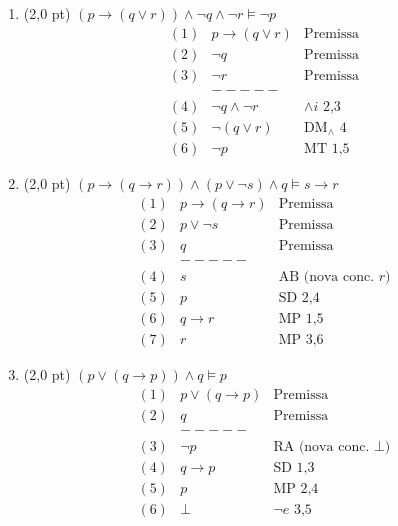 \documentclass[11pt,a4paper,oneside]{article}
\begin{document}
\begin{enumerate}
		\begin{enumerate}
			\item (2,0 pt) $(p \rightarrow (q \vee r)) \wedge \neg q \wedge \neg r \models \neg p$ \\
			{\color{verde}	
				\begin{eqnarray*}
					(1) & p \rightarrow (q \vee r) & \mbox{Premissa} \\
					(2) & \neg q  & \mbox{Premissa}\\
					(3) & \neg r & \mbox{Premissa}\\
					& ----- & \\
					(4) & \neg q \wedge \neg r & \wedge i \mbox{ 2,3}\\
					(5) & \neg (q \vee r) & \mbox{DM}_{\wedge} \mbox{ 4}\\
					(6) & \neg p & \mbox{MT 1,5}
				\end{eqnarray*}	
			}
			\item (2,0 pt) $(p \rightarrow (q \rightarrow r)) \wedge (p \vee \neg s) \wedge q \models s \rightarrow r$\\
			{\color{verde}	
				\begin{eqnarray*}
					(1) & p \rightarrow (q \rightarrow r) & \mbox{Premissa} \\
					(2) & p \vee \neg s  & \mbox{Premissa}\\
					(3) & q & \mbox{Premissa}\\
					& ----- & \\
					(4) & s & \mbox{AB (nova conc. } r \mbox{)}\\
					(5) & p & \mbox{SD 2,4}\\
					(6) & q \rightarrow r & \mbox{MP 1,5}\\
					(7) & r & \mbox{MP 3,6}
				\end{eqnarray*}	
			}			
			\item (2,0 pt) $(p \vee (q \rightarrow p)) \wedge q \models p$\\
			{\color{verde}	
				\begin{eqnarray*}
					(1) & p \vee (q \rightarrow p) & \mbox{Premissa} \\
					(2) & q  & \mbox{Premissa}\\
					& ----- & \\
					(3) & \neg p & \mbox{RA (nova conc. } \perp \mbox{)}\\
					(4) & q \rightarrow p & \mbox{SD 1,3}\\
					(5) & p & \mbox{MP 2,4}\\
					(6) & \perp & \neg e \mbox{ 3,5}
				\end{eqnarray*}	
			}
		\end{enumerate}
	
\end{enumerate}
\end{document}

